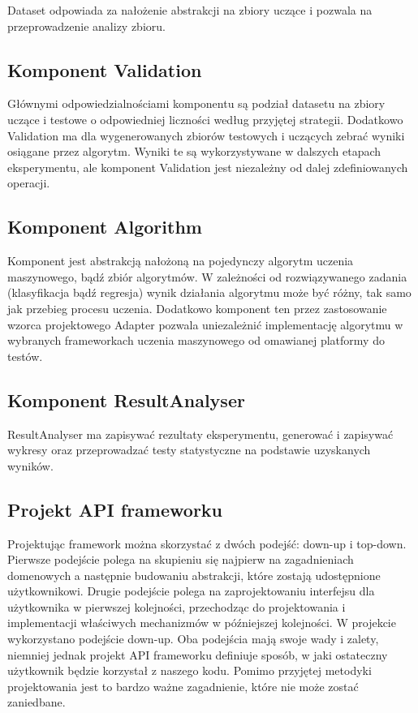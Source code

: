 \documentclass[12pt]{article}
\begin{document}
Dataset odpowiada za nałożenie abstrakcji na zbiory uczące i pozwala na przeprowadzenie analizy zbioru. 

\subsection{Komponent Validation}

Głównymi odpowiedzialnościami komponentu są podział datasetu na zbiory uczące i testowe o odpowiedniej liczności według przyjętej strategii. Dodatkowo Validation ma dla wygenerowanych zbiorów testowych i uczących zebrać wyniki osiągane przez algorytm. Wyniki te są wykorzystywane w dalszych etapach eksperymentu, ale komponent Validation jest niezależny od dalej zdefiniowanych operacji.

\subsection{Komponent Algorithm}

Komponent jest abstrakcją nałożoną na pojedynczy algorytm uczenia maszynowego, bądź zbiór algorytmów. W zależności od rozwiązywanego zadania (klasyfikacja bądź regresja) wynik działania algorytmu może być różny, tak samo jak przebieg procesu uczenia. Dodatkowo komponent ten przez zastosowanie wzorca projektowego Adapter pozwala uniezależnić implementację algorytmu w wybranych frameworkach uczenia maszynowego od omawianej platformy do testów. 

\subsection{Komponent ResultAnalyser}

ResultAnalyser ma zapisywać rezultaty eksperymentu, generować i zapisywać wykresy oraz przeprowadzać testy statystyczne na podstawie uzyskanych wyników. 

\subsection{Projekt API frameworku}

Projektując framework można skorzystać z dwóch podejść: down-up i top-down. Pierwsze podejście polega na skupieniu się najpierw na zagadnieniach domenowych a następnie budowaniu abstrakcji, które zostają udostępnione użytkownikowi. Drugie podejście polega na zaprojektowaniu interfejsu dla użytkownika w pierwszej kolejności, przechodząc do projektowania i implementacji właściwych mechanizmów w późniejszej kolejności. W projekcie wykorzystano podejście down-up. Oba podejścia mają swoje wady i zalety, niemniej jednak projekt API frameworku definiuje sposób, w jaki ostateczny użytkownik będzie korzystał z naszego kodu. Pomimo przyjętej metodyki projektowania jest to bardzo ważne zagadnienie, które nie może zostać zaniedbane. 
\end{document}
